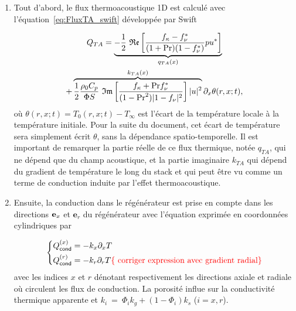 \begin{enumerate}[label=\textbf{(\roman*)}]
\item Tout d'abord, le flux thermoacoustique 1D est calculé avec l'équation~\eqref{eq:FluxTA_swift} développée par Swift \cite{swift_thermoacoustics_2017}

\begin{multline}
	Q_{TA} = \underbrace{ -\frac12~\mathfrak{Re}\left[ \frac{ f_\kappa-f_\nu^* }{ (1+\mathrm{Pr})(1-f_\nu^*) } pu^* \right] }_{q_{TA}(x)} \\ 
	+ \overbrace{ \frac12 \frac{\rho_0 C_p}{\Phi S}~\mathfrak{Im}\left[ \frac{f_\kappa + \mathrm{Pr} f_\nu^*}{(1-\mathrm{Pr}^2)|1-f_\nu|^2} \right] |u|^2 }^{k_{TA}(x)}\partial_x \theta(r,x;t),
\label{eq:FluxTA_Lotton_Regen}
\end{multline}
où $\theta(r,x;t) = T_0(r,x;t)-T_\infty$ est l'écart de la température locale à la température initiale. Pour la suite du document, cet écart de température sera simplement écrit $\theta$, sans la dépendance spatio-temporelle. Il est important de remarquer la partie réelle de ce flux thermique, notée $q_{TA}$, qui ne dépend que du champ acoustique, et la partie imaginaire $k_{TA}$ qui dépend du gradient de température le long du stack et qui peut être vu comme un terme de conduction induite par l'effet thermoacoustique.

\item Ensuite, la conduction dans le régénérateur est prise en compte dans les directions $\textbf e_x$ et $\textbf{e}_r$ du régénérateur avec l'équation exprimée en coordonnées cylindriques par


\begin{equation}
	\left\{ \begin{aligned}
		Q_{\sf cond}^{(x)} &= -k_x \partial_x T\\
		Q_{\sf cond}^{(r)} &= -k_r \partial_r T \textcolor{red}{\{\text{ corriger expression avec gradient radial}\}}
	\end{aligned}\right.
	\label{eq:FluxCond_Lotton}
\end{equation}
avec les indices $x$ et $r$ dénotant respectivement les directions axiale et radiale où circulent les flux de conduction. La porosité influe sur la conductivité thermique apparente et $k_i~=~\Phi_i k_{g} + (1-\Phi_i)k_{s}$ ($i=x,r$). 


\end{enumerate}
